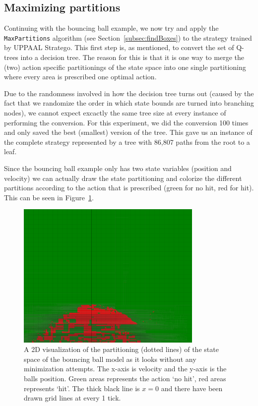 \documentclass{article}
\begin{document}
\subsection{Maximizing partitions}%
\label{subsec:experimentsMaxParts}

Continuing with the bouncing ball example, we now try and apply the
\texttt{MaxPartitions} algorithm (see Section~\ref{subsec:findBoxes}) to the
strategy trained by UPPAAL Stratego.  This first step is, as mentioned, to
convert the set of Q-trees into a decision tree. The reason for this is that it
is one way to merge the (two) action specific partitionings of the state space
into one single partitioning where every area is prescribed one optimal action.

Due to the randomness involved in how the decision tree turns out (caused by the
fact that we randomize the order in which state bounds are turned into branching
nodes), we cannot expect excactly the same tree size at every instance of
performing the conversion. For this experiment, we did the conversion 100 times
and only saved the best (smallest) version of the tree. This gave us an instance
of the complete strategy represented by a tree with 86,807 paths from the root
to a leaf.

Since the bouncing ball example only has two state variables (position and
velocity) we can actually draw the state partitioning and colorize the different
partitions according to the action that is prescribed (green for no hit, red for
hit). This can be seen in Figure~\ref{fig:ballPartitioningBefore}.

\begin{figure}[ht]
    \centering
    \includegraphics[width=0.8\textwidth]{ballPartitioningBefore}
    \caption{%
        A 2D visualization of the partitioning (dotted lines) of the state space
        of the bouncing ball model as it looks without any minimization
        attempts. The x-axis is velocity and the y-axis is the balls position.
        Green areas represents the action `no hit', red areas represents `hit'.
        The thick black line is $x=0$ and there have been drawn grid lines at
        every 1 tick.
    }\label{fig:ballPartitioningBefore}
\end{figure}
\end{document}
